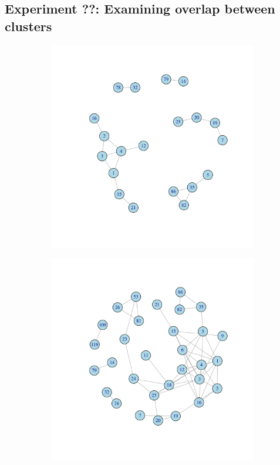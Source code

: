 \documentclass[12pt, oneside]{article}   	%
\begin{document}
	\subsection{Experiment ??: Examining overlap between clusters}
	
	\begin{figure}[H]
		\centering
		\begin{subfigure}[t]{0.48\textwidth}
			\centering
			\includegraphics[width=\linewidth]{ikc10_m_pw.pdf} 
		\end{subfigure}
		\hfill
		\begin{subfigure}[t]{0.48\textwidth}
			\centering
			\includegraphics[width=\linewidth]{ikc10_k_pw.pdf} 

\end{subfigure}
\end{figure}
\end{document}
